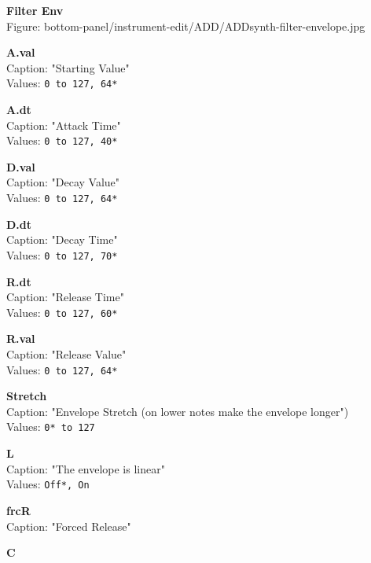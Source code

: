 \documentclass[
 11pt,
 twoside,
 a4paper,
 headinclude,
 footinclude,
 final                                 %
]{article}
\begin{document}
\begin{enumber}
\begin{enumber}
\begin{enumber}
\begin{enumber}
            \item \textbf{Filter Env} \\
               Figure: bottom-panel/instrument-edit/ADD/ADDsynth-filter-envelope.jpg
            \begin{enumber}
               \item \textbf{A.val} \\
                  Caption: "Starting Value" \\
                  Values: \texttt{0 to 127, 64*}
               \item \textbf{A.dt} \\
                  Caption: "Attack Time" \\
                  Values: \texttt{0 to 127, 40*}
               \item \textbf{D.val} \\
                  Caption: "Decay Value" \\
                  Values: \texttt{0 to 127, 64*}
               \item \textbf{D.dt} \\
                  Caption: "Decay Time" \\
                  Values: \texttt{0 to 127, 70*}
               \item \textbf{R.dt} \\
                  Caption: "Release Time" \\
                  Values: \texttt{0 to 127, 60*}
               \item \textbf{R.val} \\
                  Caption: "Release Value" \\
                  Values: \texttt{0 to 127, 64*}
               \item \textbf{Stretch} \\
                  Caption: "Envelope Stretch (on lower notes make the envelope longer") \\
                  Values: \texttt{0* to 127}
               \item \textbf{L} \\
                  Caption: "The envelope is linear" \\
                  Values: \texttt{Off*, On}
               \item \textbf{frcR} \\
                  Caption: "Forced Release"
               \item \textbf{C} \\

\end{enumber}
\end{enumber}
\end{enumber}
\end{enumber}
\end{enumber}
\end{document}
